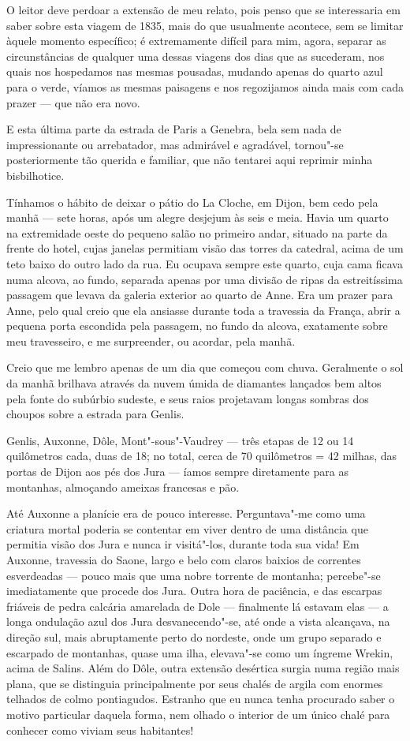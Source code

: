 O leitor deve perdoar a extensão de meu relato, pois penso que se
interessaria em saber sobre esta viagem de 1835, mais do que usualmente
acontece, sem se limitar àquele momento específico; é extremamente
difícil para mim, agora, separar as circunstâncias de qualquer uma
dessas viagens dos dias que as sucederam, nos quais nos hospedamos nas
mesmas pousadas, mudando apenas do quarto azul para o verde, víamos as
mesmas paisagens e nos regozijamos ainda mais com cada prazer --- que não
era novo.

E esta última parte da estrada de Paris a Genebra, bela sem nada de
impressionante ou arrebatador, mas admirável e agradável, tornou"-se
posteriormente tão querida e familiar, que não tentarei aqui reprimir
minha bisbilhotice.

Tínhamos o hábito de deixar o pátio do La Cloche, em Dijon, bem
cedo pela manhã --- sete horas, após um alegre desjejum às seis e meia.
Havia um quarto na extremidade oeste do pequeno salão no primeiro andar,
situado na parte da frente do hotel, cujas janelas permitiam visão das
torres da catedral, acima de um teto baixo do outro lado da rua. Eu
ocupava sempre este quarto, cuja cama ficava numa alcova, ao fundo,
separada apenas por uma divisão de ripas da estreitíssima passagem que
levava da galeria exterior ao quarto de Anne. Era um prazer para Anne,
pelo qual creio que ela ansiasse durante toda a travessia da França,
abrir a pequena porta escondida pela passagem, no fundo da alcova,
exatamente sobre meu travesseiro, e me surpreender, ou acordar, pela
manhã.

Creio que me lembro apenas de um dia que começou com chuva.
Geralmente o sol da manhã brilhava através da nuvem úmida de diamantes
lançados bem altos pela fonte do subúrbio sudeste, e seus raios
projetavam longas sombras dos choupos sobre a estrada para Genlis.

Genlis, Auxonne, Dôle, Mont"-sous"-Vaudrey --- três etapas de 12 ou 14
quilômetros cada, duas de 18; no total, cerca de 70 quilômetros = 42
milhas, das portas de Dijon aos pés dos Jura --- íamos sempre diretamente
para as montanhas, almoçando ameixas francesas e pão.

Até Auxonne a planície era de pouco interesse. Perguntava"-me como uma
criatura mortal poderia se contentar em viver dentro de uma distância
que permitia visão dos Jura e nunca ir visitá"-los, durante toda sua
vida! Em Auxonne, travessia do Saone, largo e belo com claros baixios de
correntes esverdeadas --- pouco mais que uma nobre torrente de montanha;
percebe"-se imediatamente que procede dos Jura. Outra hora de paciência,
e das escarpas friáveis de pedra calcária amarelada de Dole ---
finalmente lá estavam elas --- a longa ondulação azul dos Jura
desvanecendo"-se, até onde a vista alcançava, na direção sul, mais
abruptamente perto do nordeste, onde um grupo separado e escarpado de
montanhas, quase uma ilha, elevava"-se como um íngreme Wrekin, acima de
Salins. Além do Dôle, outra extensão desértica surgia numa região mais
plana, que se distinguia principalmente por seus chalés de argila com
enormes telhados de colmo pontiagudos. Estranho que eu nunca tenha
procurado saber o motivo particular daquela forma, nem olhado o interior
de um único chalé para conhecer como viviam seus habitantes!

